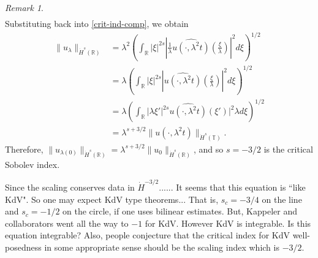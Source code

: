 \documentclass[12pt,reqno]{amsart}
\numberwithin{equation}{section}  %
\numberwithin{figure}{section}
\newcommand{\nin}{\noindent}
\newcommand{\rr}{\mathbb{R}}
\newcommand{\ci}{\mathbb{T}}
\newcommand{\wh}{\widehat}
\theoremstyle{plain}
\theoremstyle{definition}
\theoremstyle{remark}
\newtheorem{remark}{Remark}
\begin{document}
\begin{itemize}
\begin{framed}
\begin{remark}
\begin{equation*}
\begin{split}
\end{split}
\end{equation*}
%
%
Substituting back into \eqref{crit-ind-comp}, we obtain
%
%
\begin{equation*}
\begin{split}
  \| u_{\lambda} \|_{\dot{H}^s(\rr)} 
  & = \lambda^{2} \left( \int_{\rr} | \xi |^{2s} |
  \frac{1}{\lambda}\wh{u(\cdot, \lambda^{2}t)}(\frac{\xi}{\lambda}) |^2 d \xi
  \right)^{1/2}
  \\
  & = \lambda \left( \int_{\rr}| \xi |^{2s} | \wh{u(\cdot,
  \lambda^{2}t)}(\frac{\xi}{\lambda}) |^2 d \xi  \right)^{1/2}
  \\
  & = \lambda \left( \int_{\rr} | \lambda \xi' |^{2s} 
  \wh{u(\cdot, \lambda^{2}t)}(\xi') |^2 \lambda d \xi
  \right)^{1/2}
  \\
  & = \lambda^{s + 3/2} \|u(\cdot, \lambda^{2}t) \|_{\dot{H}^s (\ci)}.
\end{split}
\end{equation*}
%
%
Therefore, $\| u_{\lambda(0)} \|_{\dot{H}^s(\rr)} = \lambda^{s + 3/2} \|
u_{0} \|_{\dot{H}^{s}(\rr)}$, and so $s=-3/2$ is the critical Sobolev index.
\end{remark}
\end{framed}
\nin Since the scaling conserves data in $\dot{H}^{-3/2}$......
It seems that this equation is ``like KdV".
So one may expect KdV type theorems...
That is, $s_c=-3/4$ on the line and $s_c=-1/2$ on the circle,
if one uses bilinear estimates.
But, Kappeler and collaborators went all the way to $-1$ for KdV.
However KdV is integrable. Is this equation integrable?
Also, people conjecture that the critical index for KdV well-posedness 
in some appropriate sense should be the scaling index which is  $-3/2$.



\end{itemize}
\end{document}
